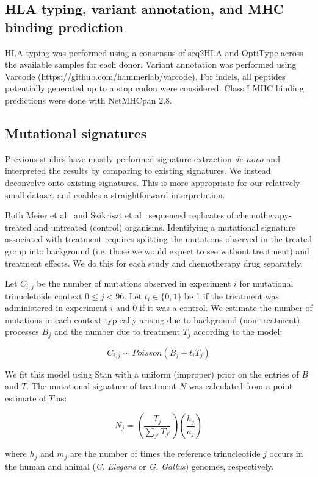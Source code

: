 \subsection*{HLA typing, variant annotation, and MHC binding prediction}
HLA typing was performed using a consensus of seq2HLA\cite{Boegel_2012} and OptiType\cite{Szolek_2014} across the available samples for each donor. Variant annotation was performed using Varcode (https://github.com/hammerlab/varcode). For indels, all peptides potentially generated up to a stop codon were considered. Class I MHC binding predictions were done with NetMHCpan 2.8\cite{Lundegaard_2008}.

\subsection*{Mutational signatures}
Previous studies have mostly performed signature extraction \textit{de novo} and interpreted the results by comparing to existing signatures. We instead deconvolve onto existing signatures. This is more appropriate for our relatively small dataset and enables a straightforward interpretation.

Both Meier et al~\cite{Meier_2014} and Szikriszt et al~\cite{Szikriszt_2016} sequenced replicates of chemotherapy-treated and untreated (control) organisms. Identifying a mutational signature associated with treatment requires splitting the mutations observed in the treated group into background (i.e. those we would expect to see without treatment) and treatment effects. We do this for each study and chemotherapy drug separately.

Let $C_{i,j}$ be the number of mutations observed in experiment $i$ for mutational trinucletoide context $0 \leq j < 96$. Let $t_i \in \{0,1\}$ be 1 if the treatment was administered in experiment $i$ and 0 if it was a control. We estimate the number of mutations in each context typically arising due to background (non-treatment) processes $B_j$ and the number due to treatment $T_j$ according to the model:

\[
C_{i,j} \sim \mathit{Poisson}(B_j + t_i T_j)
\]

We fit this model using Stan\cite{Gelman_2015} with a uniform (improper) prior on the entries of $B$ and $T$. The mutational signature of treatment $N$ was calculated from a point estimate of $T$ as:

\[
N_j = \left ( \frac{T_j}{\sum_{j'}{T_{j'}}} \right ) \left ( \frac{h_j}{a_j} \right )
\]

where $h_j$ and $m_j$ are the number of times the reference trinucleotide $j$ occurs in the human and animal (\textit{C. Elegans} or \textit{G. Gallus}) genomes, respectively.

